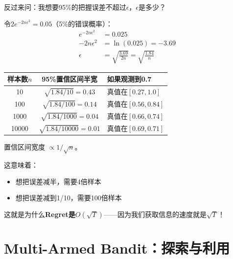 \documentclass[11pt,a4paper]{article}
\theoremstyle{definition}
\begin{document}
\begin{calculation}[构造95\%置信区间]
反过来问：我想要95\%的把握误差不超过$\epsilon$，$\epsilon$是多少？

令$2e^{-2n\epsilon^2} = 0.05$（5\%的错误概率）：
\begin{align*}
e^{-2n\epsilon^2} &= 0.025 \\
-2n\epsilon^2 &= \ln(0.025) = -3.69 \\
\epsilon &= \sqrt{\frac{3.69}{2n}} = \sqrt{\frac{1.84}{n}}
\end{align*}

\begin{center}
\begin{tabular}{c|c|l}
\toprule
样本数$n$ & 95\%置信区间半宽 & 如果观测到0.7 \\
\midrule
10 & $\sqrt{1.84/10} = 0.43$ & 真值在$[0.27, 1.0]$ \\
100 & $\sqrt{1.84/100} = 0.14$ & 真值在$[0.56, 0.84]$ \\
1000 & $\sqrt{1.84/1000} = 0.04$ & 真值在$[0.66, 0.74]$ \\
10000 & $\sqrt{1.84/10000} = 0.01$ & 真值在$[0.69, 0.71]$ \\
\bottomrule
\end{tabular}
\end{center}
\end{calculation}

\begin{keypoint}
置信区间宽度 $\propto 1/\sqrt{n}$。

这意味着：
\begin{itemize}
    \item 想把误差减半，需要4倍样本
    \item 想把误差减到1/10，需要100倍样本
\end{itemize}

这就是为什么\textbf{Regret是$O(\sqrt{T})$}——因为我们获取信息的速度就是$\sqrt{T}$！
\end{keypoint}

\section{Multi-Armed Bandit：探索与利用}
\end{document}
